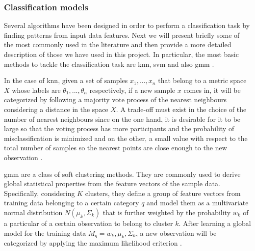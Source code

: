 	
\subsubsection{Classification models}
\label{subsubsection:classification-models}
	
	Several algorithms have been designed in order to perform a classification task by finding patterns from input data features. Next we will present briefly some of the most commonly used in the literature and then provide a more detailed description of those we have used in this project. In particular, the most basic methods to tackle the classification task are \acrshort{knn}, \acrshort{svm} and also \acrshort{gmm} \cite{Fu2011}.
	
	In the case of \acrfull{knn}, given a set of samples ${x_1, ..., x_n}$ that belong to a metric space $X$ whose labels are ${\theta_1, ..., \theta_n}$ respectively, if a new sample $x$ comes in, it will be categorized by following a majority vote process of the nearest neighbours considering a distance in the space $X$. A trade-off must exist in the choice of the number of nearest neighbours since on the one hand, it is desirable for it to be large so that the voting process has more participants and  the probability of misclassification is minimized and on the other, a small value with respect to the total number of samples so the nearest points are close enough to the new observation \cite{Cover1967}. 
	
	 \acrfull{gmm} are a class of soft clustering methods. They are commonly used to derive global statistical properties from the feature vectors of the sample data. Specifically, considering $K$ clusters, they define a group of feature vectors from training data belonging to a certain category $q$ and model them as a multivariate normal distribution $N(\mu_k, \Sigma_k)$ that is further weighted by the probability $w_k$ of a particular of a certain observation to belong to cluster $k$. After learning a global model for the training data $M_q={w_k, \mu_k, \Sigma_k}$, a new observation will be categorized by applying the maximum likelihood criterion \cite{Stowell2015}. 
	
